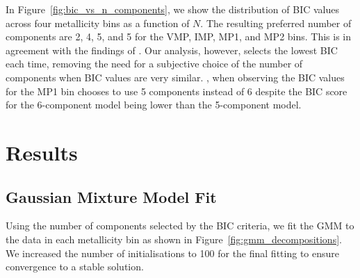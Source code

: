 \documentclass[a4paper,12pt]{article}
\begin{document}
In Figure~\ref{fig:bic_vs_n_components}, we show the distribution of BIC values across four metallicity bins as
a function of $N$. The resulting preferred number of components are 2, 4, 5, and 5 for the VMP, IMP, MP1, and MP2 bins.
This is in agreement with the findings of \citet{zhang2024existencemetalpoordiscmilky}.
Our analysis, however, selects the lowest BIC each time, removing the need for a subjective choice of the number of components
when BIC values are very similar. \citet{zhang2024existencemetalpoordiscmilky}, when observing the BIC values for the MP1 bin 
chooses to use 5 components instead of 6 despite the BIC score for the 6-component model being lower than the 5-component model.

 
\section{Results}

\subsection{Gaussian Mixture Model Fit}
\label{subsec:gmm}

Using the number of components selected by the BIC criteria, we fit the GMM to the data in each metallicity bin as shown in 
Figure~\ref{fig:gmm_decompositions}. We increased the number of initialisations to 100 for the final fitting to ensure convergence to a
stable solution.
\end{document}
